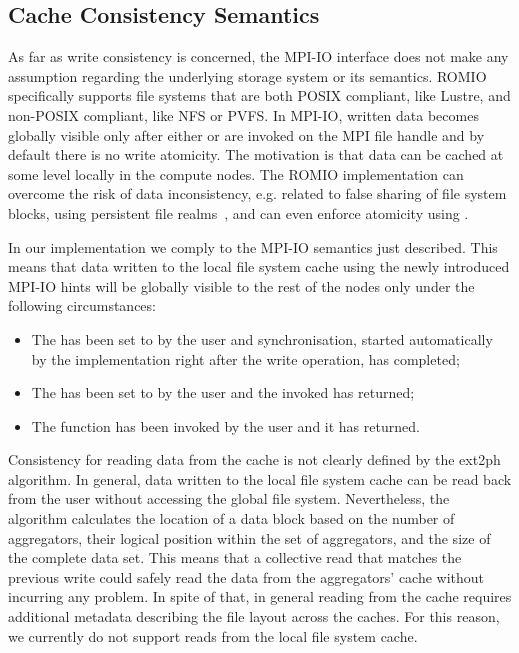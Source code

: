 \subsection{Cache Consistency Semantics}
\label{subsec: consistency}
As far as write consistency is concerned, the MPI-IO interface does not make any assumption regarding the underlying storage system or its semantics. ROMIO specifically supports file systems that are both POSIX compliant, like Lustre, and non-POSIX compliant, like NFS or PVFS. In MPI-IO, written data becomes globally visible only after either  or  are invoked on the MPI file handle and by default there is no write atomicity. The motivation is that data can be cached at some level locally in the compute nodes. The ROMIO implementation can overcome the risk of data inconsistency, e.g. related to false sharing of file system blocks, using persistent file realms~\cite{ColomaCWWRP04}, and can even enforce atomicity using .

In our implementation we comply to the MPI-IO semantics just described. This means that data written to the local file system cache using the newly introduced MPI-IO hints will be globally visible to the rest of the nodes only under the following circumstances:
\begin{itemize}
\item The  has been set to  by the user and synchronisation, started automatically by the implementation right after the write operation, has completed;
\item The  has been set to  by the user and the invoked  has returned;
\item The  function has been invoked by the user and it has returned.
\end{itemize}

Consistency for reading data from the cache is not clearly defined by the ext2ph algorithm. In general, data written to the local file system cache can be read back from the user without accessing the global file system. Nevertheless, the algorithm calculates the location of a data block based on the number of aggregators, their logical position within the set of aggregators, and the size of the complete data set. This means that a collective read that matches the previous write could safely read the data from the aggregators' cache without incurring any problem. In spite of that, in general reading from the cache requires additional metadata describing the file layout across the caches. For this reason, we currently do not support reads from the local file system cache.

